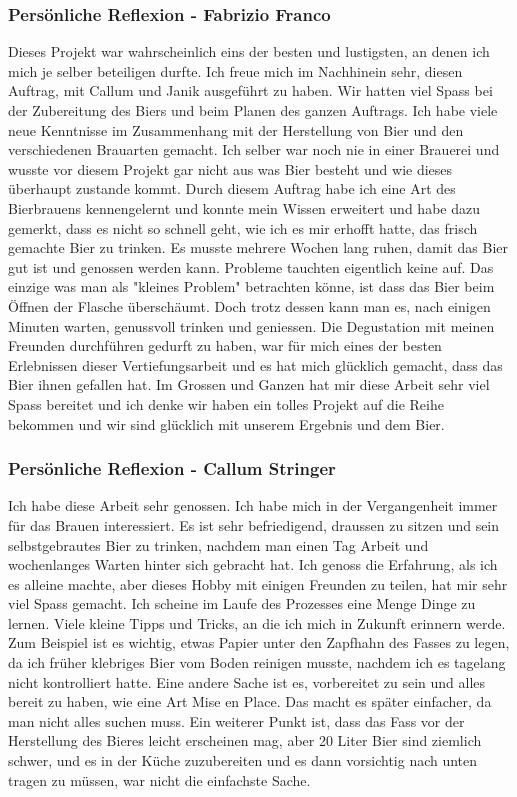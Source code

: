 \subsubsection{Persönliche Reflexion - Fabrizio Franco}
Dieses Projekt war wahrscheinlich eins der besten und lustigsten, an denen ich mich je selber beteiligen durfte. Ich freue mich im Nachhinein sehr, diesen Auftrag, mit Callum und Janik ausgeführt zu haben. Wir hatten viel Spass bei der Zubereitung des Biers und beim Planen des ganzen Auftrags. Ich habe viele neue Kenntnisse im Zusammenhang mit der Herstellung von Bier und den verschiedenen Brauarten gemacht. Ich selber war noch nie in einer Brauerei und wusste vor diesem Projekt gar nicht aus was Bier besteht und wie dieses überhaupt zustande kommt. Durch diesem Auftrag habe ich eine Art des Bierbrauens kennengelernt und konnte mein Wissen erweitert und habe dazu gemerkt, dass es nicht so schnell geht, wie ich es mir erhofft hatte, das frisch gemachte Bier zu trinken. Es musste mehrere Wochen lang ruhen, damit das Bier gut ist und genossen werden kann. Probleme tauchten eigentlich keine auf. Das einzige was man als "kleines Problem" betrachten könne, ist dass das Bier beim Öffnen der Flasche überschäumt. Doch trotz dessen kann man es, nach einigen Minuten warten, genussvoll trinken und geniessen. Die Degustation mit meinen Freunden durchführen gedurft zu haben, war für mich eines der besten Erlebnissen dieser Vertiefungsarbeit und es hat mich glücklich gemacht, dass das Bier ihnen gefallen hat. Im Grossen und Ganzen hat mir diese Arbeit sehr viel Spass bereitet und ich denke
 wir haben ein tolles Projekt auf die Reihe bekommen und wir sind glücklich mit unserem Ergebnis und dem Bier.
\subsubsection{Persönliche Reflexion - Callum Stringer}
Ich habe diese Arbeit sehr genossen. Ich habe mich in der Vergangenheit immer für das Brauen interessiert. Es ist sehr befriedigend, draussen zu sitzen und sein selbstgebrautes Bier zu trinken, nachdem man einen Tag Arbeit und wochenlanges Warten hinter sich gebracht hat.
Ich genoss die Erfahrung, als ich es alleine machte, aber dieses Hobby mit einigen Freunden zu teilen, hat mir sehr viel Spass gemacht.
Ich scheine im Laufe des Prozesses eine Menge Dinge zu lernen. Viele kleine Tipps und Tricks, an die ich mich in Zukunft erinnern werde.
Zum Beispiel ist es wichtig, etwas Papier unter den Zapfhahn des Fasses zu legen, da ich früher klebriges Bier vom Boden reinigen musste,
nachdem ich es tagelang nicht kontrolliert hatte.
Eine andere Sache ist es, vorbereitet zu sein und alles bereit zu haben, wie eine Art Mise en Place. Das macht es später einfacher, da man
nicht alles suchen muss.
Ein weiterer Punkt ist, dass das Fass vor der Herstellung des Bieres leicht erscheinen mag, aber 20 Liter Bier sind ziemlich schwer,
und es in der Küche zuzubereiten und es dann vorsichtig nach unten tragen zu müssen, war nicht die einfachste Sache.

